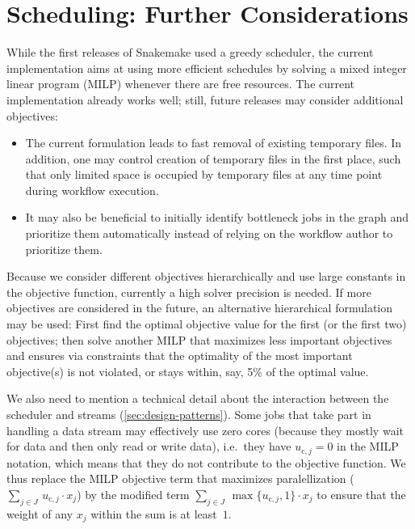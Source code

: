 \documentclass{scrartcl}
\begin{document}
\section{Scheduling: Further Considerations}
\label{sec:morescheduling}

While the first releases of Snakemake used a greedy scheduler, the current implementation aims at using more efficient schedules by solving a mixed integer linear program (MILP) whenever there are free resources.
The current implementation already works well; still, future releases may consider additional objectives:
\begin{itemize}
\item The current formulation leads to fast removal of existing temporary files. In addition, one may control creation of temporary files in the first place, such that only limited space is occupied by temporary files at any time point during workflow execution.
\item It may also be beneficial to initially identify bottleneck jobs in the graph and prioritize them automatically instead of relying on the workflow author to prioritize them.
\end{itemize}
Because we consider different objectives hierarchically and use large constants in the objective function, currently a high solver precision is needed.
If more objectives are considered in the future, an alternative hierarchical formulation may be used:
First find the optimal objective value for the first (or the first two) objectives; then solve another MILP that maximizes less important objectives and ensures via constraints that the optimality of the most important objective(s) is not violated, or stays within, say, 5\% of the optimal value.

\newcommand{\cores}{\text{c}}

We also need to mention a technical detail about the interaction between the scheduler and streams (\autoref{sec:design-patterns}).
Some jobs that take part in handling a data stream may effectively use zero cores (because they mostly wait for data and then only read or write data), i.e.\ they have $u_{\cores,j} = 0$ in the MILP notation, which means that they do not contribute to the objective function. 
We thus replace the MILP objective term that maximizes paralellization ($\sum_{j\in J}\, u_{\cores,j} \cdot x_j$) by the modified term $\sum_{j\in J}\, \max \{ u_{\cores,j}, 1\} \cdot x_j$ to ensure that the weight of any $x_j$ within the sum is at least~$1$.
\end{document}
